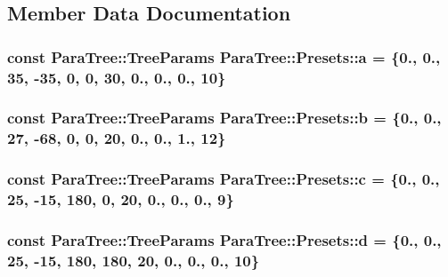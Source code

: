 \subsection{Member Data Documentation}
\subsubsection[{\texorpdfstring{a}{a}}]{\setlength{\rightskip}{0pt plus 5cm}const {\bf Para\+Tree\+::\+Tree\+Params} Para\+Tree\+::\+Presets\+::a = \{0., 0., 35, -\/35, 0, 0, 30, 0., 0., 0., 10\}\hspace{0.3cm}{\ttfamily [static]}}\hypertarget{struct_para_tree_1_1_presets_a91e10b4738fdd380fc676b38288cb81b}{}\label{struct_para_tree_1_1_presets_a91e10b4738fdd380fc676b38288cb81b}
\subsubsection[{\texorpdfstring{b}{b}}]{\setlength{\rightskip}{0pt plus 5cm}const {\bf Para\+Tree\+::\+Tree\+Params} Para\+Tree\+::\+Presets\+::b = \{0., 0., 27, -\/68, 0, 0, 20, 0., 0., 1., 12\}\hspace{0.3cm}{\ttfamily [static]}}\hypertarget{struct_para_tree_1_1_presets_a312f3c102ffcc4fcc6df99c28fc084d9}{}\label{struct_para_tree_1_1_presets_a312f3c102ffcc4fcc6df99c28fc084d9}
\subsubsection[{\texorpdfstring{c}{c}}]{\setlength{\rightskip}{0pt plus 5cm}const {\bf Para\+Tree\+::\+Tree\+Params} Para\+Tree\+::\+Presets\+::c = \{0., 0., 25, -\/15, 180, 0, 20, 0., 0., 0., 9\}\hspace{0.3cm}{\ttfamily [static]}}\hypertarget{struct_para_tree_1_1_presets_a8ac6e067f498f41f6ce8d01f3c728be3}{}\label{struct_para_tree_1_1_presets_a8ac6e067f498f41f6ce8d01f3c728be3}
\subsubsection[{\texorpdfstring{d}{d}}]{\setlength{\rightskip}{0pt plus 5cm}const {\bf Para\+Tree\+::\+Tree\+Params} Para\+Tree\+::\+Presets\+::d = \{0., 0., 25, -\/15, 180, 180, 20, 0., 0., 0., 10\}\hspace{0.3cm}{\ttfamily [static]}}\hypertarget{struct_para_tree_1_1_presets_af127f77665a64211dc6998fe4cb2c76f}{}\label{struct_para_tree_1_1_presets_af127f77665a64211dc6998fe4cb2c76f}
